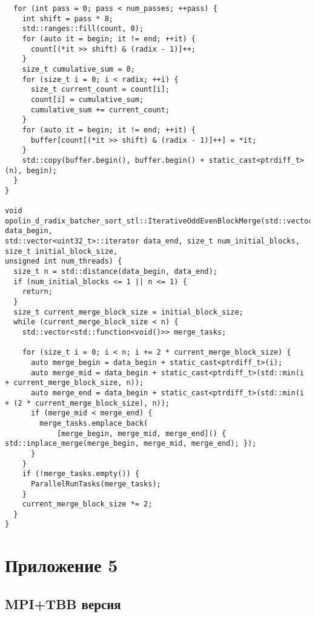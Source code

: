 \documentclass[12pt,a4paper]{extarticle}
\newcommand{\appendixsection}[1]{%
	\clearpage
	\section*{\centering Приложение #1}
	\addcontentsline{toc}{section}{Приложение #1}
}
\begin{document}
\begin{lstlisting}
  for (int pass = 0; pass < num_passes; ++pass) {
    int shift = pass * 8;
    std::ranges::fill(count, 0);
    for (auto it = begin; it != end; ++it) {
      count[(*it >> shift) & (radix - 1)]++;
    }
    size_t cumulative_sum = 0;
    for (size_t i = 0; i < radix; ++i) {
      size_t current_count = count[i];
      count[i] = cumulative_sum;
      cumulative_sum += current_count;
    }
    for (auto it = begin; it != end; ++it) {
      buffer[count[(*it >> shift) & (radix - 1)]++] = *it;
    }
    std::copy(buffer.begin(), buffer.begin() + static_cast<ptrdiff_t>(n), begin);
  }
}

void opolin_d_radix_batcher_sort_stl::IterativeOddEvenBlockMerge(std::vector<uint32_t>::iterator data_begin,
std::vector<uint32_t>::iterator data_end, size_t num_initial_blocks, size_t initial_block_size,
unsigned int num_threads) {
  size_t n = std::distance(data_begin, data_end);
  if (num_initial_blocks <= 1 || n <= 1) {
    return;
  }
  size_t current_merge_block_size = initial_block_size;
  while (current_merge_block_size < n) {
    std::vector<std::function<void()>> merge_tasks;

    for (size_t i = 0; i < n; i += 2 * current_merge_block_size) {
      auto merge_begin = data_begin + static_cast<ptrdiff_t>(i);
      auto merge_mid = data_begin + static_cast<ptrdiff_t>(std::min(i + current_merge_block_size, n));
      auto merge_end = data_begin + static_cast<ptrdiff_t>(std::min(i + (2 * current_merge_block_size), n));
      if (merge_mid < merge_end) {
        merge_tasks.emplace_back(
            [merge_begin, merge_mid, merge_end]() { std::inplace_merge(merge_begin, merge_mid, merge_end); });
      }
    }
    if (!merge_tasks.empty()) {
      ParallelRunTasks(merge_tasks);
    }
    current_merge_block_size *= 2;
  }
}
\end{lstlisting}
\appendixsection{5}
\subsection*{MPI+TBB версия}
\end{document}
